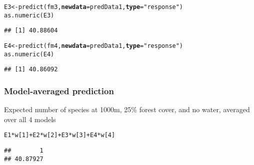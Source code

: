 \documentclass[color=usenames,dvipsnames]{beamer}\usepackage[]{graphicx}\usepackage[]{color}
\makeatletter
\newcommand{\hlnum}[1]{\textcolor[rgb]{0.69,0.494,0}{#1}}%
\newcommand{\hlstr}[1]{\textcolor[rgb]{0.749,0.012,0.012}{#1}}%
\newcommand{\hlopt}[1]{\textcolor[rgb]{0,0,0}{#1}}%
\newcommand{\hlstd}[1]{\textcolor[rgb]{0,0,0}{#1}}%
\newcommand{\hlkwb}[1]{\textcolor[rgb]{0,0.341,0.682}{#1}}%
\newcommand{\hlkwc}[1]{\textcolor[rgb]{0,0,0}{\textbf{#1}}}%
\newcommand{\hlkwd}[1]{\textcolor[rgb]{0.004,0.004,0.506}{#1}}%
\newenvironment{kframe}{%
 \def\at@end@of@kframe{}%
 \ifinner\ifhmode%
  \def\at@end@of@kframe{\end{minipage}}%
  \begin{minipage}{\columnwidth}%
 \fi\fi%
 \def\FrameCommand##1{\hskip\@totalleftmargin \hskip-\fboxsep
 \colorbox{shadecolor}{##1}\hskip-\fboxsep
     \hskip-\linewidth \hskip-\@totalleftmargin \hskip\columnwidth}%
 \MakeFramed {\advance\hsize-\width
   \@totalleftmargin\z@ \linewidth\hsize
   \@setminipage}}%
 {\par\unskip\endMakeFramed%
 \at@end@of@kframe}
\newenvironment{knitrout}{}{} %
\makeatother
\begin{document}
\begin{frame}[fragile]
\begin{knitrout}
\color{fgcolor}\begin{kframe}
\begin{alltt}
\hlstd{E3} \hlkwb{<-} \hlkwd{predict}\hlstd{(fm3,} \hlkwc{newdata}\hlstd{=predData1,} \hlkwc{type}\hlstd{=}\hlstr{"response"}\hlstd{)}
\hlkwd{as.numeric}\hlstd{(E3)}
\end{alltt}
\begin{verbatim}
## [1] 40.88604
\end{verbatim}
\end{kframe}
\end{knitrout}
\pause
\vspace{-7pt}
\begin{knitrout}\scriptsize
{}\color{fgcolor}\begin{kframe}
\begin{alltt}
\hlstd{E4} \hlkwb{<-} \hlkwd{predict}\hlstd{(fm4,} \hlkwc{newdata}\hlstd{=predData1,} \hlkwc{type}\hlstd{=}\hlstr{"response"}\hlstd{)}
\hlkwd{as.numeric}\hlstd{(E4)}
\end{alltt}
\begin{verbatim}
## [1] 40.86092
\end{verbatim}
\end{kframe}
\end{knitrout}
\end{frame}




\begin{frame}[fragile]
  \frametitle{Model-averaged prediction}
  {Expected number of species at 1000m, 25\% forest cover, and no
    water, \alert{averaged over all 4 models}}
  \pause
  \vspace{1pt}
\begin{knitrout}
\color{fgcolor}\begin{kframe}
\begin{alltt}
\hlstd{E1}\hlopt{*}\hlstd{w[}\hlnum{1}\hlstd{]} \hlopt{+} \hlstd{E2}\hlopt{*}\hlstd{w[}\hlnum{2}\hlstd{]} \hlopt{+} \hlstd{E3}\hlopt{*}\hlstd{w[}\hlnum{3}\hlstd{]} \hlopt{+} \hlstd{E4}\hlopt{*}\hlstd{w[}\hlnum{4}\hlstd{]}
\end{alltt}
\begin{verbatim}
##        1 
## 40.87927
\end{verbatim}
\end{kframe}
\end{knitrout}
\end{frame}
\end{document}
